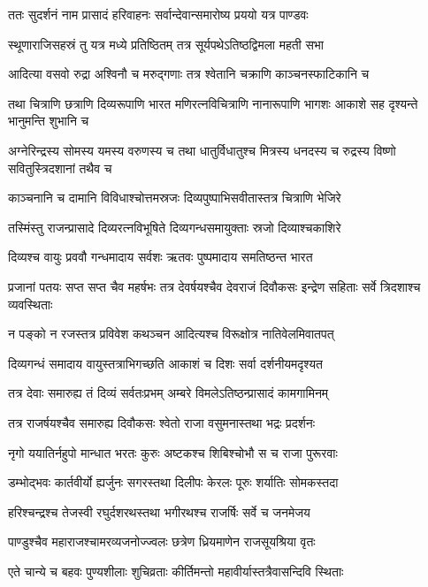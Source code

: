 \twolineshloka
{ततः सुदर्शनं नाम प्रासादं हरिवाहनः}
{सर्वान्देवान्समारोष्य प्रययो यत्र पाण्डवः}


\twolineshloka
{स्थूणाराजिसहस्रं तु यत्र मध्ये प्रतिष्ठितम्}
{तत्र सूर्यपथेऽतिष्ठद्विमला महती सभा}


\twolineshloka
{आदित्या वसवो रुद्रा अश्विनौ च मरुद्गणाः}
{तत्र श्वेतानि चक्राणि काञ्चनस्फाटिकानि च}


\threelineshloka
{तथा चित्राणि छत्राणि दिव्यरूपाणि भारत}
{मणिरत्नविचित्राणि नानारूपाणि भागशः}
{आकाशे सह दृश्यन्ते भानुमन्ति शुभानि च}


\threelineshloka
{अग्नेरिन्द्रस्य सोमस्य यमस्य वरुणस्य च}
{तथा धातुर्विधातुश्च मित्रस्य धनदस्य च}
{रुद्रस्य विष्णो सवितुस्त्रिदशानां तथैव च}


\twolineshloka
{काञ्चनानि च दामानि विविधाश्चोत्तमस्रजः}
{दिव्यपुष्पाभिसवीतास्तत्र चित्राणि भेजिरे}


\twolineshloka
{तस्मिंस्तु राजन्प्रासादे दिव्यरत्नविभूषिते}
{दिव्यगन्धसमायुक्ताः स्रजो दिव्याश्चकाशिरे}


\twolineshloka
{दिव्यश्च वायुः प्रववौ गन्धमादाय सर्वशः}
{ऋतवः पुष्पमादाय समतिष्ठन्त भारत}


\threelineshloka
{प्रजानां पतयः सप्त सप्त चैव महर्षभः}
{तत्र देवर्षयश्चैव देवराजं दिवौकसः}
{इन्द्रेण सहिताः सर्वे त्रिदशाश्च व्यवस्थिताः}


\twolineshloka
{न पङ्को न रजस्तत्र प्रविवेश कथञ्चन}
{आदित्यश्च विरूक्षोत्र नातिवेलमिवातपत्}


\twolineshloka
{दिव्यगन्धं समादाय वायुस्तत्राभिगच्छति}
{आकाशं च दिशः सर्वा दर्शनीयमदृश्यत}


\twolineshloka
{तत्र देवाः समारुह्य तं दिव्यं सर्वतःप्रभम्}
{अम्बरे विमलेऽतिष्ठन्प्रासादं कामगामिनम्}


\twolineshloka
{तत्र राजर्षयश्चैव समारुह्य दिवौकसः}
{श्वेतो राजा वसुमनास्तथा भद्रः प्रदर्शनः}


\twolineshloka
{नृगो ययातिर्नहुपो मान्धात भरतः कुरुः}
{अष्टकश्च शिबिश्चोभौ स च राजा पुरूरवाः}


\twolineshloka
{डम्भोद्भवः कार्तवीर्यो ह्यर्जुनः सगरस्तथा}
{दिलीपः केरलः पूरुः शर्यातिः सोमकस्तदा}


\twolineshloka
{हरिश्चन्द्रश्च तेजस्वी रघुर्दशरथस्तथा}
{भगीरथश्च राजर्षिः सर्वे च जनमेजय}


\twolineshloka
{पाण्डुश्चैव महाराजश्चामरव्यजनोज्ज्वलः}
{छत्रेण ध्रियमाणेन राजसूयश्रिया वृतः}


\twolineshloka
{एते चान्ये च बहवः पुण्यशीलाः शुचिव्रताः}
{कीर्तिमन्तो महावीर्यास्तत्रैवासन्दिवि स्थिताः}


